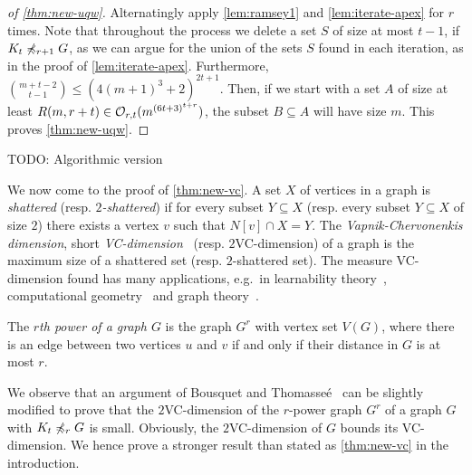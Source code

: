 \begin{proof}[of \cref{thm:new-uqw}]
Alternatingly apply \cref{lem:ramsey1} and \cref{lem:iterate-apex} 
for $r$ times. Note that throughout the process we delete a set $S$ of 
size at most $t-1$, if $K_t\not\preccurlyeq_{r+1} G$, as we can argue 
for the union of the sets $S$ found in each iteration, as in the proof
of \cref{lem:iterate-apex}. Furthermore, 
$\binom{m+t-2}{t-1}\leq (4(m+1)^3+2)^{2t+1}$. 
Then, if we start with a set $A$ of size at least 
$R(m,r+t)\in\mathcal{O}_{r,t}(m^{(6t+3)^{t+r}})$, the 
subset $B\subseteq A$ will have size $m$. This proves \cref{thm:new-uqw}. 
\end{proof}

TODO: Algorithmic version

We now come to the proof of \cref{thm:new-vc}. A set $X$ of vertices 
in a graph is \emph{shattered} (resp. \emph{$2$-shattered}) if for every
subset $Y\subseteq X$ (resp. every subset $Y\subseteq X$ of size $2$) there exists 
a vertex $v$ such that $N[v]\cap X=Y$. The \emph{Vapnik-Chervonenkis dimension}, short \emph{VC-dimension}~\cite{chervonenkis1971theory} (resp.
$2$VC-dimension) of a graph is the maximum size of a shattered set (resp. $2$-shattered set). The measure VC-dimension found has many applications, e.g.\ in learnability theory~\cite{haussler1987}, computational geometry~\cite{chazelle1989quasi} and graph theory~\cite{alon2006dominating,BousquetT15,chepoi2007covering,eickmeyer2016neighborhood}.


The \emph{$r$th power of a graph $G$} is the graph $G^r$
with vertex set $V(G)$, where there is an edge between two 
vertices $u$ and $v$ if and only if their distance in $G$ is at most $r$. 

We observe that an argument of Bousquet and 
Thomasse\'e~\cite{BousquetT15} can be slightly modified to prove that 
the $2$VC-dimension of the $r$-power graph $G^r$ of a graph $G$
with $K_t\not\preccurlyeq_r G$ is small. Obviously, the $2$VC-dimension of $G$
bounds its VC-dimension. We hence prove a stronger result
than stated as \cref{thm:new-vc} in the introduction. 

